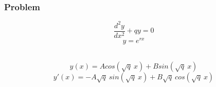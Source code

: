 \documentclass[xcolor=dvipsnames]{beamer}
\begin{document}
\begin{frame}
\frametitle{Problem}
\begin{equation} \label{eq:simplified}
	\dfrac{d^2y}{dx^2} + qy = 0 \nonumber
\end{equation}
\begin{equation}
	y=e^{rx}
\end{equation}

\\
\begin{equation}
 y(x) = A cos(\sqrt{q}\:x)+B sin(\sqrt{q}\:x) \nonumber
\end{equation}
\begin{equation}
 y'(x) = -A\sqrt{q}\: sin(\sqrt{q}\:x) + B\sqrt{q}\:cos(\sqrt{q}\:x) \nonumber
\end{equation}
\end{frame}
\end{document}

